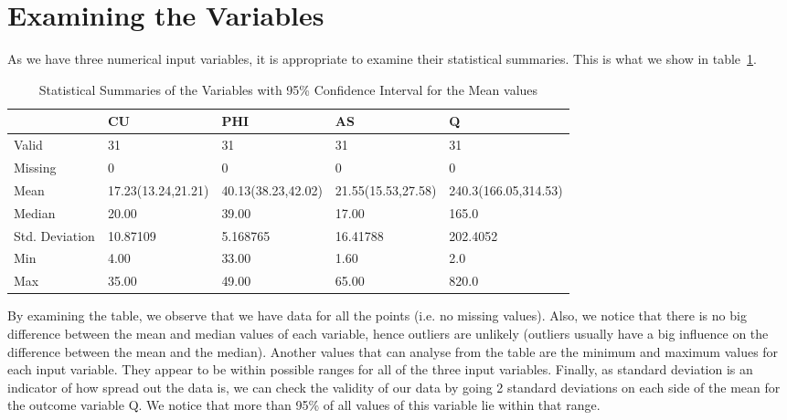 \documentclass[a4paper,12pt, english]{article}
\begin{document}
\section{Examining the Variables}
As we have three numerical input variables, it is appropriate to examine their statistical summaries. This is what we show in table~\ref{table:stats-summaries}.
\begin{table}[H]
\begin{center}
    \begin{tabular}{ | p{3cm} | p{2.5cm} | p{2.5cm} | p{2.5cm} | p{2.5cm} |}
    \hline
     & CU & PHI & AS & Q\\ \hline
    Valid & 31 & 31 & 31 & 31\\ \hline  
    Missing & 0 & 0 & 0 & 0\\ \hline  
    Mean   & 17.23\tiny{(13.24,21.21)}   & 40.13\tiny{(38.23,42.02)}   & 21.55\tiny{(15.53,27.58)} & 240.3\tiny{(166.05,314.53)} \\ \hline  
    Median & 20.00  & 39.00 & 17.00 & 165.0 \\ \hline
    Std. Deviation & 10.87109 & 5.168765 & 16.41788 & 202.4052\\ \hline  
    Min & 4.00 & 33.00 & 1.60 & 2.0\\ \hline  
    Max & 35.00 & 49.00 & 65.00 & 820.0  \\ \hline     
    \end{tabular}
\end{center}
\caption{Statistical Summaries of the Variables with 95\% Confidence Interval for the Mean values}
\label{table:stats-summaries}
\end{table}

By examining the table, we observe that we have data for all the points (i.e. no missing values). Also, we notice that there is no big difference between the mean and median values of each variable, hence outliers are unlikely (outliers usually have a big influence on the difference between the mean and the median). Another values that can analyse from the table are the minimum and maximum values for each input variable. They appear to be within possible ranges for all of the three input variables. Finally, as standard deviation is an indicator of how spread out the data is, we can check the validity of our data by going 2 standard deviations on each side of the mean for the outcome variable Q. We notice that more than 95\% of all values of this variable lie within that range.
\end{document}
